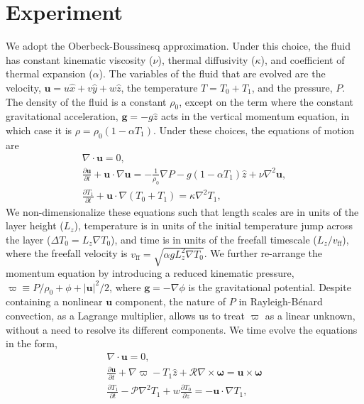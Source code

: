 \documentclass[aps, pre, onecolumn, nofootinbib, notitlepage, groupedaddress, amsfonts, amssymb, amsmath, longbibliography]{revtex4-1}
\newcommand{\DivU}{\ensuremath{\nabla\cdot\bm{u}}}
\newcommand{\grad}{\ensuremath{\nabla}}
\newcommand{\RB}{Rayleigh-B\'{e}nard }
\begin{document}
\section{Experiment}
\label{sec:experiment}
We adopt the Oberbeck-Boussinesq approximation.  Under this choice, the
fluid has constant kinematic viscosity ($\nu$), thermal diffusivity ($\kappa$), and coefficient
of thermal expansion ($\alpha$). The variables of the fluid that are evolved are the velocity,
$\bm{u} = u\hat{x} + v\hat{y} + w\hat{z}$, the temperature $T = T_0 + T_1$, and the pressure, $P$.
The density of the fluid is a constant $\rho_0$, except on the
term where the constant gravitational acceleration, $\bm{g} = - g\hat{z}$ acts in the vertical momentum equation, 
in which case it is $\rho = \rho_0(1  - \alpha T_1)$.  
Under these choices, the equations of motion are \cite{spiegel&veronis1960}
\begin{gather}
\DivU = 0, 
	\label{eqn:dim_incompressible}
\\
\frac{\partial \bm{u}}{\partial t} + \bm{u}\cdot\grad\bm{u} =
-\frac{1}{\rho_0}\grad P - g( 1 - \alpha T_1)\hat{z} + \nu\grad^2\bm{u}, 
	\label{eqn:dim_bouss_momentum}
\\
\frac{\partial T_1}{\partial t} + \bm{u}\cdot\grad(T_0 + T_1) = \kappa\grad^2 T_1,
	\label{eqn:dim_bouss_energy}
\end{gather}
We non-dimensionalize these equations such that length scales are in units of the layer height ($L_z$),
temperature is in units of the initial temperature jump across the layer ($\Delta T_0 = L_z \grad T_0$), 
and time is in units of the freefall timescale ($L_z / v_{\text{ff}}$), where the freefall velocity is
$v_{\text{ff}} = \sqrt{\alpha g L_z^2 \grad T_0}$.
We further re-arrange the momentum equation by introducing a reduced kinematic pressure,
$\varpi \equiv P / \rho_0 + \phi + |\bm{u}|^2 / 2$, where $\bm{g} = -\grad \phi$ is the gravitational potential.
Despite containing a nonlinear $\bm{u}$ component, the nature of $P$ in \RB convection, as a
Lagrange multiplier,
allows us to treat $\varpi$ as a linear unknown, without a need to resolve its different components.
We time evolve the equations in the form,
\begin{gather}
\DivU = 0, 
	\label{eqn:incompressible}
\\
\frac{\partial \bm{u}}{\partial t} + \grad \varpi - T_1\hat{z} + \mathcal{R}\grad\times\bm{\omega} = \bm{u}\times\bm{\omega}
	\label{eqn:bouss_momentum}
\\
\frac{\partial T_1}{\partial t} - \mathcal{P}\grad^2 T_1 + w \frac{\partial T_0}{\partial z} = - \bm{u}\cdot\grad T_1,
	\label{eqn:bouss_energy}
\end{gather}
\end{document}
